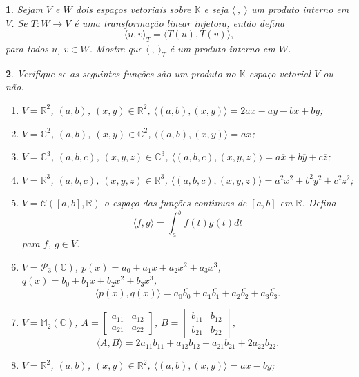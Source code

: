 \documentclass[12pt]{exam}
\newtheorem{exercicio}{}
\newcommand{\real}{\mathbb{R}}
\newcommand{\complex}{\mathbb{C}}
\newcommand{\cp}[1]{\mathbb{#1}}
\begin{document}
\begin{exercicio}
  Sejam $V$ e $W$ dois espa\c{c}os vetoriais sobre $\cp{K}$ e seja $\langle\ ,\ \rangle$ um produto interno em $V$. Se $T : W \to V$ \'e uma transforma\c{c}\~ao linear injetora, ent\~ao defina
    \[
        \langle u , v \rangle_T = \langle T(u) , T(v) \rangle,
    \]
    para todos $u$, $v \in W$. Mostre que $\langle\ ,\ \rangle_T$ \'e um produto interno em $W$.
\end{exercicio}

\begin{exercicio}
  Verifique se as seguintes fun\c{c}\~oes s\~ao um produto no $\cp{K}$-espa\c{c}o vetorial $V$ ou n\~ao.
  \begin{enumerate}[label=({\alph*})]
    \item $V = \real^2$, $(a,b)$, $(x, y) \in \real^2$, $\langle (a,b) , (x,y) \rangle = 2ax - ay - bx + by$;
    \item $V = \complex^2$, $(a,b)$, $(x, y) \in \complex^2$, $\langle (a,b) , (x,y) \rangle = ax$;
    \item $V = \complex^3$, $(a, b, c)$, $(x, y, z) \in \complex^3$, $\langle (a, b, c) , (x, y, z) \rangle = a\overline{x} + b\overline{y} + c\overline{z}$;
    \item $V = \real^3$, $(a, b, c)$, $(x, y, z) \in \real^3$, $\langle (a, b, c) , (x, y, z) \rangle = a^2x^2 + b^2y^2 + c^2z^2$;
    \item $V = \mathcal{C}([a,b], \real)$ o espa\c{c}o das fun\c{c}\~oes cont{\'\i}nuas de $[a,b]$ em $\real$. Defina
    \[
        \langle f , g \rangle = \int_a^bf(t)g(t)dt
    \]
    para $f$, $g \in V$.
    \item $V = \mathcal{P}_3(\complex)$, $p(x) = a_0 + a_1x + a_2x^2 + a_3x^3$, $q(x) = b_0 + b_1x + b_2x^2 + b_3x^3$,
    \[
        \langle p(x) , q(x) \rangle = a_0\overline{b_0} + a_1\overline{b_1} + a_2\overline{b_2} + a_3\overline{b_3}.
    \]
    \item $V = \cp{M}_2(\complex)$, $A = \begin{bmatrix}
      a_{11} & a_{12}\\
      a_{21} & a_{22}
    \end{bmatrix}$, $B = \begin{bmatrix}
      b_{11} & b_{12}\\
      b_{21} & b_{22}
    \end{bmatrix}$,
    \[
        \langle A, B \rangle = 2a_{11}b_{11} + a_{12}b_{12} + a_{21}b_{21} + 2a_{22}b_{22}.
    \]
    \item $V = \real^2$, $(a,b)$, $(x, y) \in \real^2$, $\langle (a,b) , (x,y) \rangle = ax - by$;

\end{enumerate}
\end{exercicio}
\end{document}
